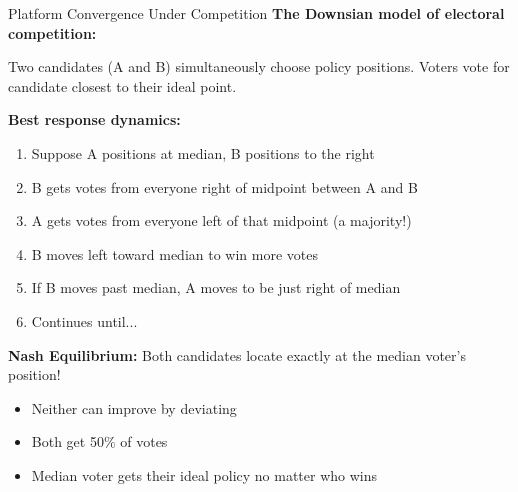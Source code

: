 \documentclass[10pt]{beamer}
\begin{document}
\begin{frame}[allowframebreaks]{Platform Convergence Under Competition}
\textbf{The Downsian model of electoral competition:}


Two candidates (A and B) simultaneously choose policy positions. Voters vote for candidate closest to their ideal point.



\textbf{Best response dynamics:}
\begin{enumerate}
\item Suppose A positions at median, B positions to the right

\item B gets votes from everyone right of midpoint between A and B

\item A gets votes from everyone left of that midpoint (a majority!)

\item B moves left toward median to win more votes

\item If B moves past median, A moves to be just right of median

\item Continues until...
\end{enumerate}

\framebreak

\alert{\textbf{Nash Equilibrium:}} Both candidates locate exactly at the median voter's position!
\begin{itemize}
\item Neither can improve by deviating
\item Both get 50\% of votes
\item Median voter gets their ideal policy no matter who wins
\end{itemize}
\end{frame}
\end{document}
